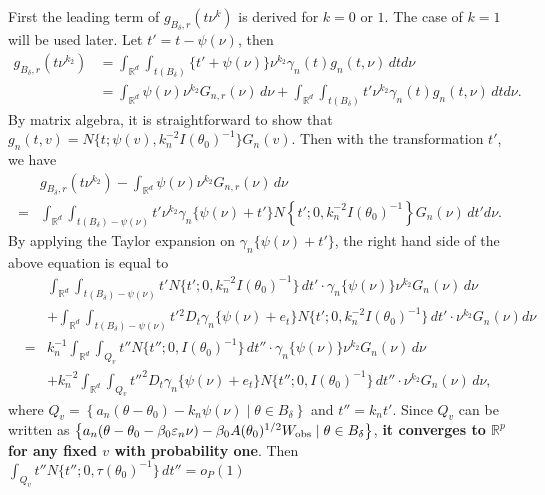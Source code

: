 \documentclass{article}
\begin{document}
	First the leading term of $g_{B_{\delta},r}(t\nu^{k})$ is derived
	for $k=0$ or $1$. The case of $k=1$ will be used later. Let $t'=t-\psi(\nu)$,
	then 
	\begin{align*}
	g_{B_{\delta},r}(t\nu^{k_{2}}) & =\int_{\mathbb{R}^{d}}\int_{t(B_{\delta})}\{t'+\psi(\nu)\}\nu^{k_{2}}\gamma_{n}(t)g_{n}(t,\nu)\,dtd\nu\\
	& =\int_{\mathbb{R}^{d}}\psi(\nu)\nu^{k_{2}}G_{n,r}(\nu)\,d\nu+\int_{\mathbb{R}^{d}}\int_{t(B_{\delta})}t'\nu^{k_{2}}\gamma_{n}(t)g_{n}(t,\nu)\,dtd\nu.
	\end{align*}
	By matrix algebra, it is straightforward to show that $g_{n}(t,v)=N\{t;\psi(v),k_{n}^{-2}I(\theta_{0})^{-1}\}G_{n}(v)$.
	Then with the transformation $t'$, we have
	\begin{align*}
	& g_{B_{\delta},r}(t\nu^{k_{2}})-\int_{\mathbb{R}^{d}}\psi(\nu)\nu^{k_{2}}G_{n,r}(\nu)\,d\nu\\
	= & \int_{\mathbb{R}^{d}}\int_{t(B_{\delta})-\psi(\nu)}t'\nu^{k_{2}}\gamma_{n}\{\psi(\nu)+t'\}N\left\{ t';0,k_{n}^{-2}I(\theta_{0})^{-1}\right\} G_{n}(\nu)\,dt'd\nu.
	\end{align*}
	By applying the Taylor expansion on $\gamma_{n}\{\psi(\nu)+t'\}$,
	the right hand side of the above equation is equal to 
	\begin{eqnarray}
	&  & \int_{\mathbb{R}^{d}}\int_{t(B_{\delta})-\psi(\nu)}t'N\{t';0,k_{n}^{-2}I(\theta_{0})^{-1}\}\,dt'\cdot\gamma_{n}\{\psi(\nu)\}\nu^{k_{2}}G_{n}(\nu)\,d\nu\nonumber \\
	&  & +\int_{\mathbb{R}^{d}}\int_{t(B_{\delta})-\psi(\nu)}t'{}^{2}D_{t}\gamma_{n}\{\psi(\nu)+e_{t}\}N\{t';0,k_{n}^{-2}I(\theta_{0})^{-1}\}\,dt'\cdot\nu^{k_{2}}G_{n}(\nu)d\nu\nonumber \\
	& = & k_{n}^{-1}\int_{\mathbb{R}^{d}}\int_{Q_{v}}t''N\{t'';0,I(\theta_{0})^{-1}\}\,dt''\cdot\gamma_{n}\{\psi(\nu)\}\nu^{k_{2}}G_{n}(\nu)\,d\nu\nonumber \\
	&  & +k_{n}^{-2}\int_{\mathbb{R}^{d}}\int_{Q_{v}}t''^{2}D_{t}\gamma_{n}\{\psi(\nu)+e_{t}\}N\{t'';0,I(\theta_{0})^{-1}\}\,dt''\cdot\nu^{k_{2}}G_{n}(\nu)\,d\nu,\label{eq5}
	\end{eqnarray}
	where $Q_{v}=\left\{ a_{n}(\theta-\theta_{0})-k_{n}\psi(\nu)\mid\theta\in B_{\delta}\right\} $
	and $t''=k_{n}t'$. 
	Since $Q_{v}$ can be written as $\left\{ a_{n}(\theta-\theta_{0}-\beta_{0}\varepsilon_{n}\nu)-\beta_{0}A(\theta_{0})^{1/2}W_{\rm obs}\mid\theta\in B_{\delta}\right\} $,
	{\bf it converges to $\mathbb{R}^{p}$ for any fixed $v$ with probability
	one}. Then $\int_{Q_{v}}t''N\{t'';0,\tau(\theta_{0})^{-1}\}\,dt''=o_{P}(1)$
\end{document}
